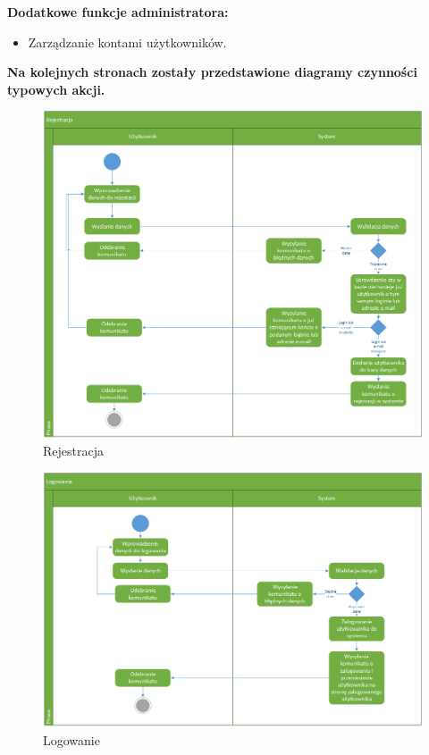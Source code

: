 \textbf{Dodatkowe funkcje administratora:}
\begin{itemize}
	\item Zarządzanie kontami użytkowników.
\end{itemize}


\textbf{Na kolejnych stronach zostały przedstawione diagramy czynności typowych akcji.}
	\begin{figure}[H]
	\centering
	\includegraphics[scale=0.5]{Rejestracja}
	\caption{\label{fig:activity_01}Rejestracja}
	\end{figure}
	\begin{figure}[H]
	\centering
	\includegraphics[scale=0.5]{Logowanie}
	\caption{\label{fig:activity_02}Logowanie}
	\end{figure}
